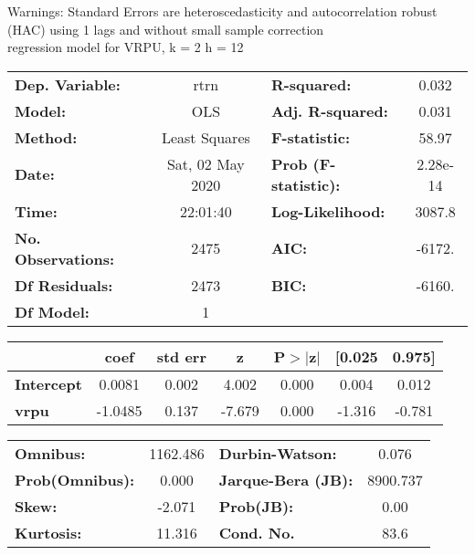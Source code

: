 Warnings: \newline
 [1] Standard Errors are heteroscedasticity and autocorrelation robust (HAC) using 1 lags and without small sample correction\\ 

regression model for VRPU, k = 2 h = 12\begin{center}
\begin{tabular}{lclc}
\toprule
\textbf{Dep. Variable:}    &       rtrn       & \textbf{  R-squared:         } &     0.032   \\
\textbf{Model:}            &       OLS        & \textbf{  Adj. R-squared:    } &     0.031   \\
\textbf{Method:}           &  Least Squares   & \textbf{  F-statistic:       } &     58.97   \\
\textbf{Date:}             & Sat, 02 May 2020 & \textbf{  Prob (F-statistic):} &  2.28e-14   \\
\textbf{Time:}             &     22:01:40     & \textbf{  Log-Likelihood:    } &    3087.8   \\
\textbf{No. Observations:} &        2475      & \textbf{  AIC:               } &    -6172.   \\
\textbf{Df Residuals:}     &        2473      & \textbf{  BIC:               } &    -6160.   \\
\textbf{Df Model:}         &           1      & \textbf{                     } &             \\
\bottomrule
\end{tabular}
\begin{tabular}{lcccccc}
                   & \textbf{coef} & \textbf{std err} & \textbf{z} & \textbf{P$> |$z$|$} & \textbf{[0.025} & \textbf{0.975]}  \\
\midrule
\textbf{Intercept} &       0.0081  &        0.002     &     4.002  &         0.000        &        0.004    &        0.012     \\
\textbf{vrpu}      &      -1.0485  &        0.137     &    -7.679  &         0.000        &       -1.316    &       -0.781     \\
\bottomrule
\end{tabular}
\begin{tabular}{lclc}
\textbf{Omnibus:}       & 1162.486 & \textbf{  Durbin-Watson:     } &    0.076  \\
\textbf{Prob(Omnibus):} &   0.000  & \textbf{  Jarque-Bera (JB):  } & 8900.737  \\
\textbf{Skew:}          &  -2.071  & \textbf{  Prob(JB):          } &     0.00  \\
\textbf{Kurtosis:}      &  11.316  & \textbf{  Cond. No.          } &     83.6  \\
\bottomrule
\end{tabular}
\end{center}

